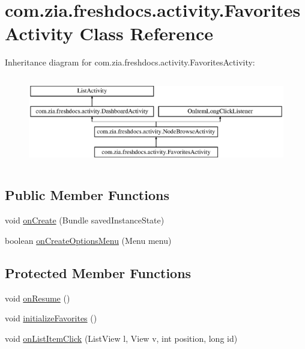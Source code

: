 \hypertarget{classcom_1_1zia_1_1freshdocs_1_1activity_1_1_favorites_activity}{\section{com.\-zia.\-freshdocs.\-activity.\-Favorites\-Activity Class Reference}
\label{classcom_1_1zia_1_1freshdocs_1_1activity_1_1_favorites_activity}
}
Inheritance diagram for com.\-zia.\-freshdocs.\-activity.\-Favorites\-Activity\-:\begin{figure}[H]
\begin{center}
\leavevmode
\includegraphics[height=3.929825cm]{classcom_1_1zia_1_1freshdocs_1_1activity_1_1_favorites_activity}
\end{center}
\end{figure}
\subsection*{Public Member Functions}
\begin{DoxyCompactItemize}
\item 
void \hyperlink{classcom_1_1zia_1_1freshdocs_1_1activity_1_1_favorites_activity_a5ff510f94442cc6e5c3cfe215ef5c6d9}{on\-Create} (Bundle saved\-Instance\-State)
\item 
boolean \hyperlink{classcom_1_1zia_1_1freshdocs_1_1activity_1_1_favorites_activity_abd0b0bdbb65a8961ada51b24531c74de}{on\-Create\-Options\-Menu} (Menu menu)
\end{DoxyCompactItemize}
\subsection*{Protected Member Functions}
\begin{DoxyCompactItemize}
\item 
void \hyperlink{classcom_1_1zia_1_1freshdocs_1_1activity_1_1_favorites_activity_abc6f2604af9f7fedaf130ba7dbbce025}{on\-Resume} ()
\item 
void \hyperlink{classcom_1_1zia_1_1freshdocs_1_1activity_1_1_favorites_activity_a3c6fbb19a742c0471fdf4ee5352caee1}{initialize\-Favorites} ()
\item 
void \hyperlink{classcom_1_1zia_1_1freshdocs_1_1activity_1_1_favorites_activity_a6c1ca625ab6f3c4f11d2d9fbb2e38368}{on\-List\-Item\-Click} (List\-View l, View v, int position, long id)
\end{DoxyCompactItemize}
